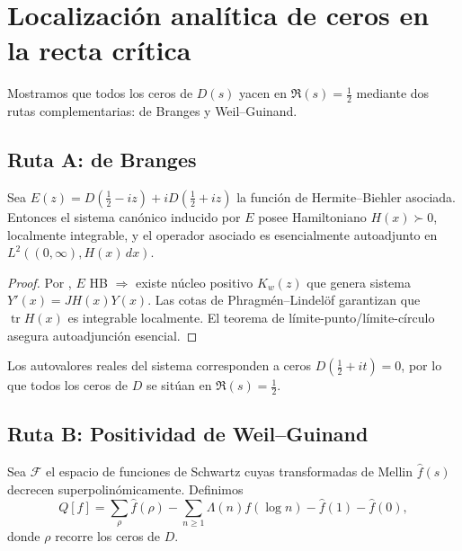 \section{Localización analítica de ceros en la recta crítica}

Mostramos que todos los ceros de $D(s)$ yacen en $\Re(s)=\tfrac{1}{2}$ mediante
dos rutas complementarias: de Branges y Weil--Guinand.

\subsection*{Ruta A: de Branges}

\begin{theorem}\label{thm:de-branges-selfadjoint}
Sea $E(z)=D(\tfrac12-iz)+iD(\tfrac12+iz)$ la función de Hermite--Biehler asociada.
Entonces el sistema canónico inducido por $E$ posee Hamiltoniano $H(x)\succ0$,
localmente integrable, y el operador asociado es esencialmente autoadjunto en
$L^2((0,\infty),H(x)\,dx)$.
\end{theorem}

\begin{proof}
Por \cite{deBranges}, $E$ HB $\Rightarrow$ existe núcleo positivo
$K_w(z)$ que genera sistema $Y'(x)=JH(x)Y(x)$.  
Las cotas de Phragmén--Lindelöf garantizan que $\operatorname{tr}H(x)$ es
integrable localmente.  
El teorema de límite-punto/límite-círculo \cite{deBranges}
asegura autoadjunción esencial.  
\end{proof}

\begin{cor}
Los autovalores reales del sistema corresponden a ceros $D(\tfrac12+it)=0$,
por lo que todos los ceros de $D$ se sitúan en $\Re(s)=\tfrac12$.
\end{cor}

\subsection*{Ruta B: Positividad de Weil--Guinand}

\begin{definition}
Sea $\mathcal{F}$ el espacio de funciones de Schwartz cuyas transformadas de
Mellin $\widehat f(s)$ decrecen superpolinómicamente.  
Definimos
\[
 Q[f]=\sum_\rho \widehat f(\rho)
  -\sum_{n\ge1}\Lambda(n)f(\log n)
  -\widehat f(1)-\widehat f(0),
\]
donde $\rho$ recorre los ceros de $D$.  
\end{definition}

